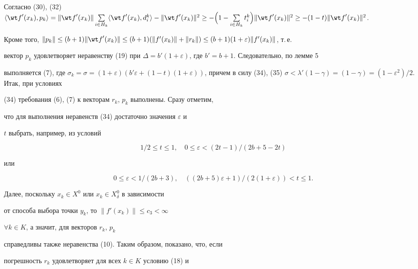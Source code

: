 Согласно (30), (32) $\langle {{\wt f}'(x_k),p_k}\rangle =\|


{{\wt f}'(x_k)}\|\sum\limits_{i\in H_k}\langle {{\wt


f}'(x_k),d_i^k}\rangle -\|{{\wt f}'(x_k)}\|


^2\ge -\Big(1-\sum\limits_{i\in H_k}t_i^k\Big)\|{{\wt f}'(x_k)}


\|^2\ge -(1-t)\|{{\wt f}'(x_k)}\|^2$.


Кроме того, $\|{p_k}\|\le (b+1)\|{{\wt f}'(x_k)}


\|\le (b+1)(\|{{f}'(x_k)}\|+\|{r_k}


\|)\le (b+1)(1+\varepsilon)\|{{f}'(x_k)}\|$, т.\,е.


вектор $p_k$ удовлетворяет неравенству (19) при $\Delta


={b}'(1+\varepsilon)$, где ${b}'=b+1$. Следовательно, по лемме 5


выполняется (7), где $\sigma_k=\sigma =(1+\varepsilon)({b}'\varepsilon


+(1-t)(1+\varepsilon))$, причем в силу (34), (35) $\sigma<{\lambda}'


(1-\gamma)=(1-\gamma)=(1-\varepsilon^2)/2$. Итак, при условиях


(34) требования (6), (7) к векторам $r_k$, $p_k$ выполнены. Сразу отметим,


что для выполнения неравенств (34) достаточно значения $\varepsilon $ и


$t$ выбрать, например, из условий


$$


1/2\le t\le 1,\quad 0\le\varepsilon<(2t-1)/(2b+5-2t)


$$


или


$$


0\le\varepsilon<1/(2b+3),


\quad ((2b+5)\varepsilon+1)/(2(1+\varepsilon))<t\le 1.


$$





Далее, поскольку $x_k\in X^{0}$ или $x_k\in X_\delta^{0}$ в зависимости


от способа выбора точки $y_k$, то $\|{{f}'(x_k)}\|\le c_3<\infty$


$\forall k\in K$, а значит, для векторов $r_k$, $p_k$


справедливы также неравенства (10). Таким образом, показано, что, если


погрешность $r_k$ удовлетворяет для всех $k\in K$ условию (18) и


